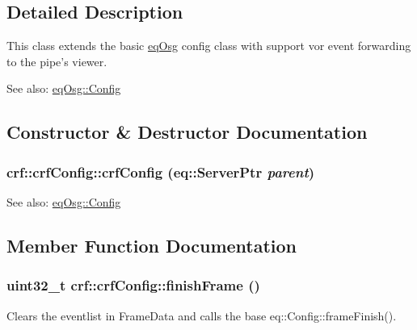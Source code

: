 \subsection{Detailed Description}
This class extends the basic \hyperlink{a00045}{eqOsg} config class with support vor event forwarding to the pipe's viewer. 

\begin{Desc}
\item[See also:]\hyperlink{a00003}{eqOsg::Config} \end{Desc}


\subsection{Constructor \& Destructor Documentation}
\hypertarget{a00004_3ddcfcc9f305f6e8502078f922d7280f}{
\subsubsection[{crfConfig}]{\setlength{\rightskip}{0pt plus 5cm}crf::crfConfig::crfConfig (eq::ServerPtr {\em parent})}}
\label{a00004_3ddcfcc9f305f6e8502078f922d7280f}


\begin{Desc}
\item[See also:]\hyperlink{a00003}{eqOsg::Config} \end{Desc}


\subsection{Member Function Documentation}
\hypertarget{a00004_ebe9cfdff7f345f6d1f706be246520f7}{
\subsubsection[{finishFrame}]{\setlength{\rightskip}{0pt plus 5cm}uint32\_\-t crf::crfConfig::finishFrame ()}}
\label{a00004_ebe9cfdff7f345f6d1f706be246520f7}


Clears the eventlist in FrameData and calls the base eq::Config::frameFinish(). 

